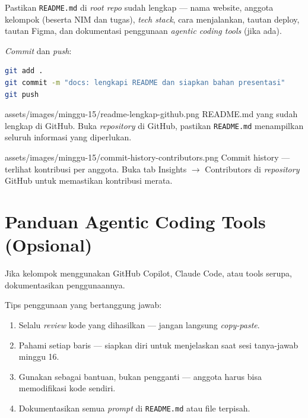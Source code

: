 \begin{langkah}
  \item Pastikan \texttt{README.md} di \emph{root repo} sudah lengkap --- nama website, anggota kelompok (beserta NIM dan tugas), \emph{tech stack}, cara menjalankan, tautan deploy, tautan Figma, dan dokumentasi penggunaan \emph{agentic coding tools} (jika ada).
  \item \emph{Commit} dan \emph{push}:
\begin{lstlisting}[language=bash, caption={Final commit documentation}]
git add .
git commit -m "docs: lengkapi README dan siapkan bahan presentasi"
git push
\end{lstlisting}
\end{langkah}

\begin{tangkapanlayar}
  {assets/images/minggu-15/readme-lengkap-github.png}
  {README.md yang sudah lengkap di GitHub.}
  {Buka \emph{repository} di GitHub, pastikan \texttt{README.md} menampilkan seluruh informasi yang diperlukan.}
\end{tangkapanlayar}

\begin{tangkapanlayar}
  {assets/images/minggu-15/commit-history-contributors.png}
  {Commit history --- terlihat kontribusi per anggota.}
  {Buka tab Insights $\rightarrow$ Contributors di \emph{repository} GitHub untuk memastikan kontribusi merata.}
\end{tangkapanlayar}

\section{Panduan Agentic Coding Tools (Opsional)}
\label{sec:agentic-coding}

Jika kelompok menggunakan GitHub Copilot, Claude Code, atau tools serupa, dokumentasikan penggunaannya.

\begin{catatan}
Tips penggunaan yang bertanggung jawab:
\begin{enumerate}
  \item Selalu \emph{review} kode yang dihasilkan --- jangan langsung \emph{copy-paste}.
  \item Pahami setiap baris --- siapkan diri untuk menjelaskan saat sesi tanya-jawab minggu 16.
  \item Gunakan sebagai bantuan, bukan pengganti --- anggota harus bisa memodifikasi kode sendiri.
  \item Dokumentasikan semua \emph{prompt} di \texttt{README.md} atau file terpisah.
\end{enumerate}
\end{catatan}

